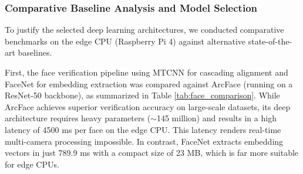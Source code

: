 \documentclass[12pt,a4paper]{article}
\begin{document}
\begin{table}[h]
    \centering
    \caption{Multi-Hazard Anomaly Detection Model Metrics (Actual Experimental Results)}
    \label{tab:anomaly_bench}
\end{table}

\begin{table}[h]
    \centering
    \caption{Multi-Camera Processing Frame Rate (FPS) Scalability (Pi 4 CPU Mode)}
    \label{tab:fps_bench}
\end{table}

\subsubsection*{Comparative Baseline Analysis and Model Selection}
To justify the selected deep learning architectures, we conducted comparative benchmarks on the edge CPU (Raspberry Pi 4) against alternative state-of-the-art baselines.

First, the face verification pipeline using MTCNN for cascading alignment and FaceNet for embedding extraction was compared against ArcFace \cite{arcface_2019} (running on a ResNet-50 backbone), as summarized in Table \ref{tab:face_comparison}. 
While ArcFace achieves superior verification accuracy on large-scale datasets, its deep architecture requires heavy parameters ($\sim$145 million) and results in a high latency of 4500 ms per face on the edge CPU. This latency renders real-time multi-camera processing impossible. In contrast, FaceNet extracts embedding vectors in just 789.9 ms with a compact size of 23 MB, which is far more suitable for edge CPUs.
\end{document}
